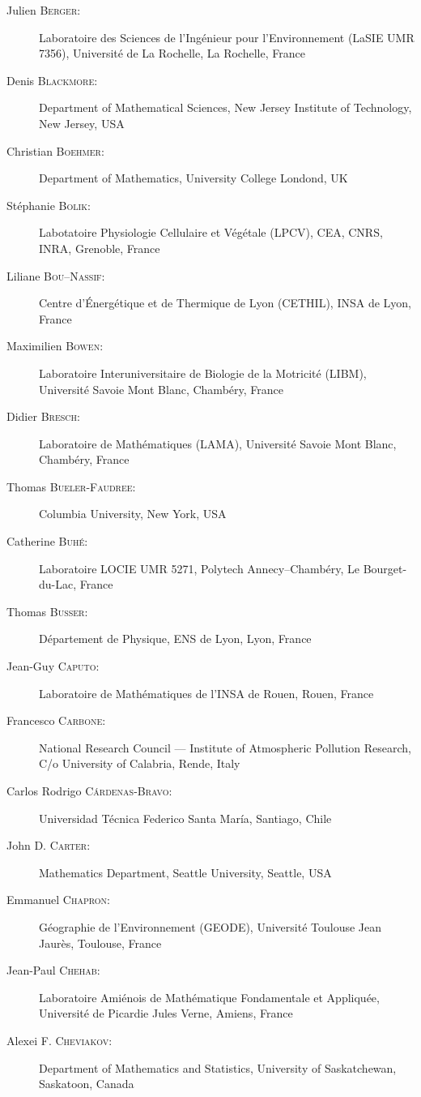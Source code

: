 \begin{description}
  \item[Julien \textsc{Berger}:] Laboratoire des Sciences de l'Ing\'enieur pour l'Environnement (LaSIE UMR 7356), Universit\'e de La Rochelle, La Rochelle, France
  \item[Denis \textsc{Blackmore}:] Department of Mathematical Sciences, New Jersey Institute of Technology, New Jersey, USA
  \item[Christian \textsc{Boehmer}:] Department of Mathematics, University College Londond, UK
  \item[St\'ephanie \textsc{Bolik}:] Labotatoire Physiologie Cellulaire et V\'eg\'etale (LPCV), CEA, CNRS, INRA, Grenoble, France
  \item[Liliane \textsc{Bou--Nassif}:] Centre d'\'Energ\'etique et de Thermique de Lyon (CETHIL), INSA de Lyon, France
  \item[Maximilien \textsc{Bowen}:] Laboratoire Interuniversitaire de Biologie de la Motricit\'e (LIBM), Universit\'e Savoie Mont Blanc, Chamb\'ery, France
  \item[Didier \textsc{Bresch}:] Laboratoire de Math\'ematiques (LAMA), Universit\'e Savoie Mont Blanc, Chamb\'ery, France
  \item[Thomas \textsc{Bueler-Faudree}:] Columbia University, New York, USA
  \item[Catherine \textsc{Buh\'e}:] Laboratoire LOCIE UMR 5271, Polytech Annecy--Chamb\'ery, Le Bourget-du-Lac, France
  \item[Thomas \textsc{Busser}:] D\'epartement de Physique, ENS de Lyon, Lyon, France
  \item[Jean-Guy \textsc{Caputo}:] Laboratoire de Math\'ematiques de l'INSA de Rouen, Rouen, France
  \item[Francesco \textsc{Carbone}:] National Research Council --- Institute of Atmospheric Pollution Research, C/o University of Calabria, Rende, Italy
  \item[Carlos Rodrigo \textsc{Cárdenas-Bravo}:] Universidad Técnica Federico Santa María, Santiago, Chile
  \item[John D. \textsc{Carter}:] Mathematics Department, Seattle University, Seattle, USA
  \item[Emmanuel \textsc{Chapron}:] G\'eographie de l'Environnement (GEODE), Universit\'e Toulouse Jean Jaur\`es, Toulouse, France
  \item[Jean-Paul \textsc{Chehab}:] Laboratoire Ami\'enois de Math\'ematique Fondamentale et Appliqu\'ee, Universit\'e de Picardie Jules Verne, Amiens, France
  \item[Alexei F. \textsc{Cheviakov}:] Department of Mathematics and Statistics, University of Saskatchewan, Saskatoon, Canada

\end{description}
